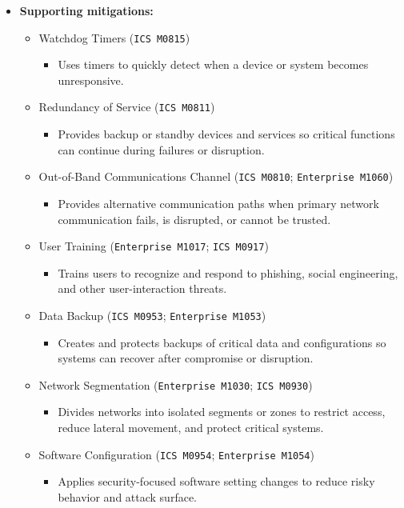 \documentclass[10pt,a4paper,oneside]{report}
\begin{document}
\begin{itemize}
\item \textbf{Supporting mitigations:}
\begin{itemize}
\item Watchdog Timers (\texttt{ICS M0815})
\begin{itemize}
\item Uses timers to quickly detect when a device or system becomes unresponsive.
\end{itemize}
\item Redundancy of Service (\texttt{ICS M0811})
\begin{itemize}
\item Provides backup or standby devices and services so critical functions can continue during failures or disruption.
\end{itemize}
\item Out-of-Band Communications Channel (\texttt{ICS M0810}; \texttt{Enterprise M1060})
\begin{itemize}
\item Provides alternative communication paths when primary network communication fails, is disrupted, or cannot be trusted.
\end{itemize}
\item User Training (\texttt{Enterprise M1017}; \texttt{ICS M0917})
\begin{itemize}
\item Trains users to recognize and respond to phishing, social engineering, and other user-interaction threats.
\end{itemize}
\item Data Backup (\texttt{ICS M0953}; \texttt{Enterprise M1053})
\begin{itemize}
\item Creates and protects backups of critical data and configurations so systems can recover after compromise or disruption.
\end{itemize}
\item Network Segmentation (\texttt{Enterprise M1030}; \texttt{ICS M0930})
\begin{itemize}
\item Divides networks into isolated segments or zones to restrict access, reduce lateral movement, and protect critical systems.
\end{itemize}
\item Software Configuration (\texttt{ICS M0954}; \texttt{Enterprise M1054})
\begin{itemize}
\item Applies security-focused software setting changes to reduce risky behavior and attack surface.
\end{itemize}
\end{itemize}
\end{itemize}
\end{document}
